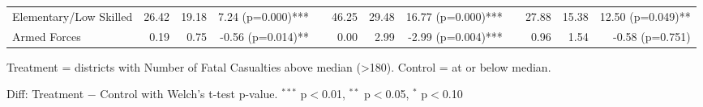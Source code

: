\begin{table}[htbp]
\begin{tabular}{l rrr c rrr c rrr}
\quad Elementary/Low Skilled & 26.42 & 19.18 & 7.24 (p=0.000)*** &  & 46.25 & 29.48 & 16.77 (p=0.000)*** &  & 27.88 & 15.38 & 12.50 (p=0.049)** \\
\quad Armed Forces & 0.19 & 0.75 & -0.56 (p=0.014)** &  & 0.00 & 2.99 & -2.99 (p=0.004)*** &  & 0.96 & 1.54 & -0.58 (p=0.751) \\
\bottomrule
\end{tabular}
\begin{tablenotes}
\small
\item Treatment = districts with Number of Fatal Casualties above median (>180). Control = at or below median.
\item Diff: Treatment $-$ Control with Welch's t-test p-value. $^{{***}}$ p$<$0.01, $^{{**}}$ p$<$0.05, $^{{*}}$ p$<$0.10
\end{tablenotes}
\end{table}

\clearpage

